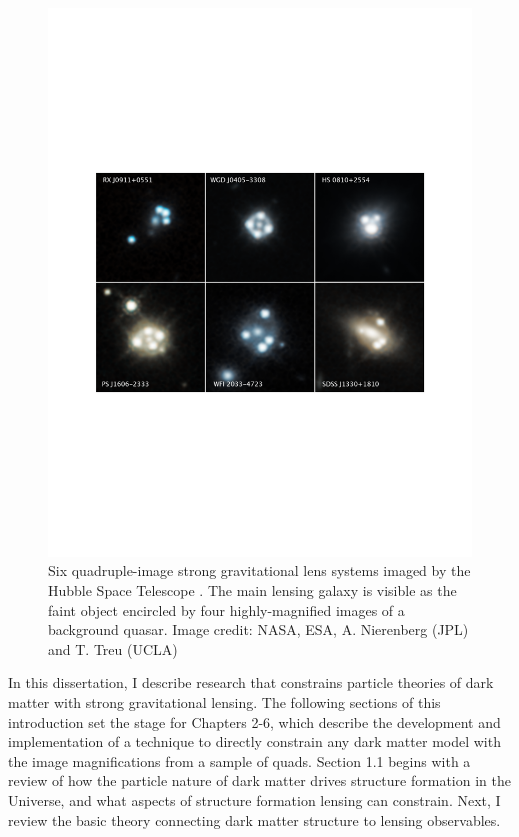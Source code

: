 \begin{figure}
	\centering
	\includegraphics[clip,trim=2.5cm 8cm 2.5cm
	8.5cm,width=.95\textwidth,keepaspectratio]{./figures_introduction/lenses.pdf}
	\caption{\label{fig:lens2033} Six quadruple-image strong gravitational lens systems imaged by the Hubble Space Telescope \cite{Nierenberg++19}. The main lensing galaxy is visible as the faint object encircled by four highly-magnified images of a background quasar. Image credit: NASA, ESA, A. Nierenberg (JPL) and T. Treu (UCLA)}
\end{figure}	
In this dissertation, I describe research that constrains particle theories of dark matter with strong gravitational lensing. The following sections of this introduction set the stage for Chapters 2-6, which describe the development and implementation of a technique to directly constrain any dark matter model with the image magnifications from a sample of quads. Section 1.1 begins with a review of how the particle nature of dark matter drives structure formation in the Universe, and what aspects of structure formation lensing can constrain. Next, I review the basic theory connecting dark matter structure to lensing observables. 

